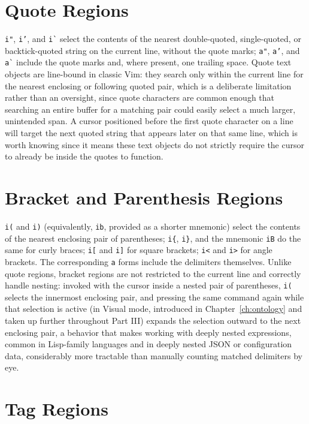 \section{Quote Regions}

\texttt{i"}, \texttt{i'}, and \texttt{i\`{}} select the contents of the nearest double-quoted, single-quoted, or backtick-quoted string on the current line, without the quote marks; \texttt{a"}, \texttt{a'}, and \texttt{a\`{}} include the quote marks and, where present, one trailing space. Quote text objects are line-bound in classic Vim: they search only within the current line for the nearest enclosing or following quoted pair, which is a deliberate limitation rather than an oversight, since quote characters are common enough that searching an entire buffer for a matching pair could easily select a much larger, unintended span. A cursor positioned before the first quote character on a line will target the next quoted string that appears later on that same line, which is worth knowing since it means these text objects do not strictly require the cursor to already be inside the quotes to function.

\section{Bracket and Parenthesis Regions}

\texttt{i(} and \texttt{i)} (equivalently, \texttt{ib}, provided as a shorter mnemonic) select the contents of the nearest enclosing pair of parentheses; \texttt{i\{}, \texttt{i\}}, and the mnemonic \texttt{iB} do the same for curly braces; \texttt{i[} and \texttt{i]} for square brackets; \texttt{i<} and \texttt{i>} for angle brackets. The corresponding \texttt{a} forms include the delimiters themselves. Unlike quote regions, bracket regions are not restricted to the current line and correctly handle nesting: invoked with the cursor inside a nested pair of parentheses, \texttt{i(} selects the innermost enclosing pair, and pressing the same command again while that selection is active (in Visual mode, introduced in Chapter~\ref{ch:ontology} and taken up further throughout Part III) expands the selection outward to the next enclosing pair, a behavior that makes working with deeply nested expressions, common in Lisp-family languages and in deeply nested JSON or configuration data, considerably more tractable than manually counting matched delimiters by eye.

\section{Tag Regions}

